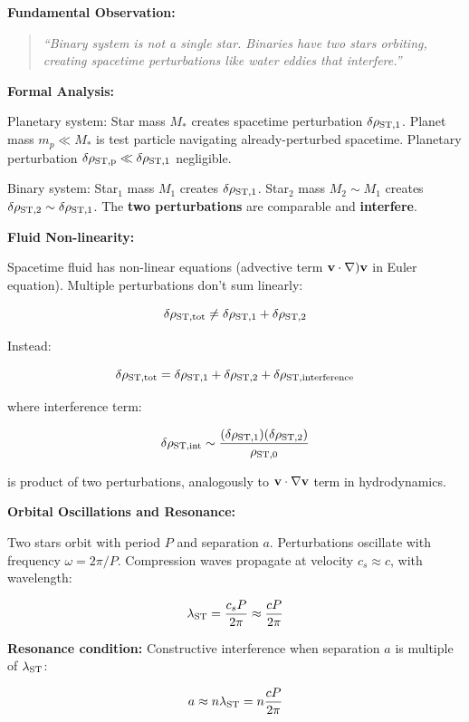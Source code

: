 \documentclass[11pt,a4paper]{article}
\begin{document}
\textbf{Fundamental Observation:}

\begin{quote}
\emph{``Binary system is not a single star. Binaries have two stars
orbiting, creating spacetime perturbations like water eddies that
interfere.''}
\end{quote}

\textbf{Formal Analysis:}

Planetary system: Star mass \(M_*\) creates spacetime perturbation
\(\delta \rho_{\rm ST,1}\). Planet mass \(m_p \ll M_*\) is test particle
navigating already-perturbed spacetime. Planetary perturbation
\(\delta \rho_{\rm ST,p} \ll \delta \rho_{\rm ST,1}\) negligible.

Binary system: Star$_{1}$ mass \(M_1\) creates \(\delta \rho_{\rm ST,1}\).
Star$_{2}$ mass \(M_2 \sim M_1\) creates
\(\delta \rho_{\rm ST,2} \sim \delta \rho_{\rm ST,1}\). The \textbf{two
perturbations} are comparable and \textbf{interfere}.

\textbf{Fluid Non-linearity:}

Spacetime fluid has non-linear equations (advective term
\({\bf v} \cdot \nabla){\bf v}\) in Euler equation). Multiple
perturbations don't sum linearly:

\[\delta \rho_{\rm ST,tot} \neq \delta \rho_{\rm ST,1} + \delta \rho_{\rm ST,2}\]

Instead:

\[\delta \rho_{\rm ST,tot} = \delta \rho_{\rm ST,1} + \delta \rho_{\rm ST,2} + \delta \rho_{\rm ST,interference}\]

where interference term:

\[\delta \rho_{\rm ST,int} \sim \frac{(\delta \rho_{\rm ST,1}) (\delta \rho_{\rm ST,2})}{\rho_{\rm ST,0}}\]

is product of two perturbations, analogously to
\({\bf v} \cdot \nabla {\bf v}\) term in hydrodynamics.

\textbf{Orbital Oscillations and Resonance:}

Two stars orbit with period \(P\) and separation \(a\). Perturbations
oscillate with frequency \(\omega = 2\pi/P\). Compression waves
propagate at velocity \(c_s \approx c\), with wavelength:

\[\lambda_{\rm ST} = \frac{c_s P}{2\pi} \approx \frac{c P}{2\pi}\]

\textbf{Resonance condition:} Constructive interference when separation
\(a\) is multiple of \(\lambda_{\rm ST}\):

\[a \approx n \lambda_{\rm ST} = n \frac{c P}{2\pi}\]
\end{document}
